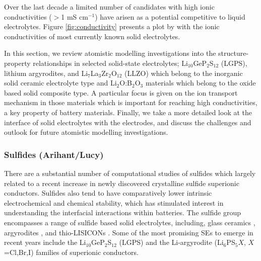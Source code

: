 \documentclass[../main.tex]{subfiles}
\begin{document}
Over the last decade a limited number of candidates with high ionic conductivities ($>$1 mS cm$^{-1}$) have arisen as a potential competitive to liquid electrolytes.\cite{kanno_synthesis_2000, murayama_synthesis_2002, murayama_material_2004, minafra_influence_2019,bron_li_2013,whiteley_empowering_2014,huang_superionic_2019,yamane_crystal_2007,homma_crystal_2011} Figure \ref{fig:conductivity} presents a plot by \citeauthor{Kamaya2011} with the ionic conductivities of most currently known solid electrolytes.

In this section, we review atomistic modelling investigations into the structure-property relationships in selected solid-state electrolytes; Li$_{10}$GeP$_2$S$_{12}$ (LGPS), lithium argyrodites, and Li$_7$La$_3$Zr$_2$O$_{12}$ (LLZO) which belong to the inorganic solid ceramic electrolyte type and Li$_{2}$O:B$_{2}$O$_{3}$ materials which belong to the oxide based solid composite type. A particular focus is given on the ion transport mechanism in those materials which is important for reaching high conductivities, a key property of battery materials. Finally, we take a more detailed look at the interface of solid electrolytes with the electrodes, and discuss the challenges and outlook for future atomistic modelling investigations.

\subsubsection{Sulfides (Arihant/Lucy)}
There are a substantial number of computational studies of sulfides which largely related to a recent increase in newly discovered crystalline sulfide superionic conductors. Sulfides also tend to have comparatively lower intrinsic electrochemical and chemical stability, which has stimulated interest in understanding the interfacial interactions within batteries. \cite{Xiao2020interfacerev} The sulfide group encompasses a range of sulfide based solid electrolytes, including, glass ceramics \cite{minami2006recent}, argyrodites \cite{bai2020research}, and thio-LISICONs \cite{minafra2020two}. Some of the most promising SEs to emerge in recent years include the Li$_{10}$GeP$_2$S$_{12}$ (LGPS) \cite{Bhandari2016,Kamaya2011,Mo2012} and the Li-argyrodite (Li$_6$PS$_{5}X$, $X$=Cl,Br,I) \cite{kraft2018,deiseroth_li6ps5x_2008,deklerk2016,kraft2017,minafra2018,adeli2019} families of superionic conductors.
\end{document}
